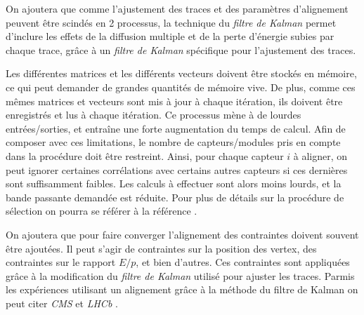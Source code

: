    \medskip
   
   On ajoutera que comme l'ajustement des traces et des param\`etres d'alignement peuvent \^etre scind\'es en 2 processus, la technique du \textit{filtre de Kalman} permet d'inclure les effets de la diffusion multiple et de la perte d'énergie subies par chaque trace, grâce \`a un \textit{filtre de Kalman} sp\'ecifique pour l'ajustement des traces.
   
   \medskip
   
   Les diff\'erentes matrices et les diff\'erents vecteurs doivent \^etre stock\'es en m\'emoire, ce qui peut demander de grandes quantit\'es de m\'emoire vive. De plus, comme ces m\^emes matrices et vecteurs sont mis \`a jour \`a chaque it\'eration, ils doivent \^etre enregistr\'es et lus \`a chaque it\'eration. Ce processus m\`ene \`a de lourdes entr\'ees/sorties, et entraîne une forte augmentation du temps de calcul. Afin de composer avec ces limitations, le nombre de capteurs/modules pris en compte dans la proc\'edure doit \^etre restreint. Ainsi, pour chaque capteur $i$ \`a aligner, on peut ignorer certaines corrélations avec certains autres capteurs si ces derni\`eres sont suffisamment faibles. Les calculs \`a effectuer sont alors moins lourds, et la bande passante demand\'ee est r\'eduite. Pour plus de d\'etails sur la proc\'edure de sélection on pourra se r\'ef\'erer \`a la r\'ef\'erence \cite{Widl:2006mz}.   
   
   \medskip
   
   On ajoutera que pour faire converger l'alignement des contraintes doivent souvent \^etre ajout\'ees. Il peut s'agir de contraintes sur la position des vertex, des contraintes sur le rapport $E/p$, et bien d'autres. Ces contraintes sont appliqu\'ees gr\^ace \`a la modification du \textit{filtre de Kalman} utilis\'e pour ajuster les traces. Parmis les exp\'eriences utilisant un alignement grâce \`a la m\'ethode du filtre de Kalman on peut citer \textit{CMS} \cite{Sprenger:2010ss} et \textit{LHCb} \cite{Amoraal:1346053}.
   




